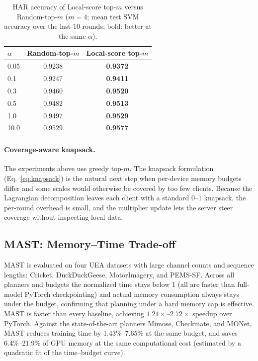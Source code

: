 \documentclass[sigconf]{acmart}
\begin{document}
\begin{table}[t]
  \centering
  \caption{HAR accuracy of Local-score top-$m$ versus Random-top-$m$ ($m{=}4$;
  mean test SVM accuracy over the last 10 rounds; bold: better at the same
  $\alpha$).}
  \label{tab:random_vs_topm}
  \begin{tabular}{lcc}
    \toprule
    $\alpha$ & Random-top-$m$ & Local-score top-$m$ \\
    \midrule
    0.05  & 0.9238 & \textbf{0.9372} \\
    0.1   & 0.9247 & \textbf{0.9411} \\
    0.3   & 0.9460 & \textbf{0.9520} \\
    0.5   & 0.9482 & \textbf{0.9513} \\
    1.0   & 0.9497 & \textbf{0.9529} \\
    10.0  & 0.9529 & \textbf{0.9577} \\
    \bottomrule
  \end{tabular}
\end{table}

\paragraph{Coverage-aware knapsack.}
The experiments above use greedy top-$m$. The knapsack formulation
(Eq.~\eqref{eq:knapsack}) is the natural next step when per-device memory budgets
differ and some scales would otherwise be covered by too few clients. Because the
Lagrangian decomposition leaves each client with a standard 0--1 knapsack, the
per-round overhead is small, and the multiplier update lets the server steer
coverage without inspecting local data.

\subsection{MAST: Memory--Time Trade-off}

MAST is evaluated on four UEA datasets with large channel counts and sequence
lengths: Cricket, DuckDuckGeese, MotorImagery, and PEMS-SF. Across all planners
and budgets the normalized time stays below 1 (all are faster than full-model
PyTorch checkpointing) and actual memory consumption always stays under the
budget, confirming that planning under a hard memory cap is effective. MAST is
faster than every baseline, achieving $1.21\times$--$2.72\times$ speedup over
PyTorch. Against the state-of-the-art planners Mimose, Checkmate, and MONet, MAST
reduces training time by 1.43\%--7.65\% at the same budget, and saves
6.4\%--21.9\% of GPU memory at the same computational cost (estimated by a
quadratic fit of the time--budget curve).
\end{document}

